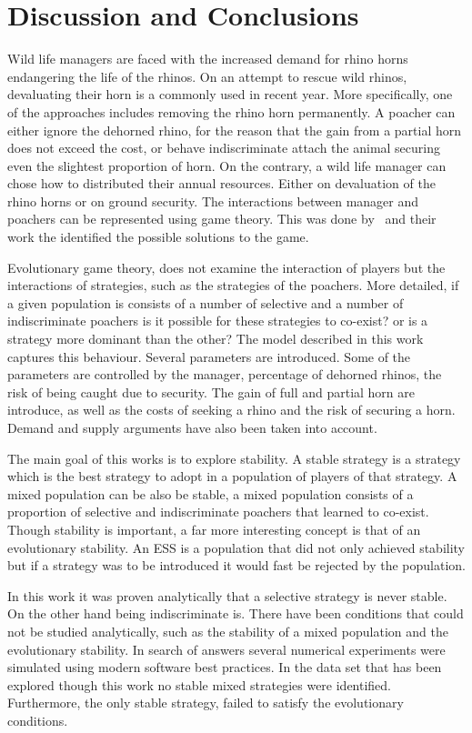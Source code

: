 \documentclass[10pt]{article}
\begin{document}
\section{Discussion and Conclusions}

Wild life managers are faced with the increased demand for rhino horns endangering
the life of the rhinos. On an attempt to rescue wild rhinos, devaluating their horn
is a commonly used in recent year.  More specifically, one of the approaches 
includes removing the rhino horn permanently.  A poacher can either
ignore the dehorned rhino, for the reason that the gain from a partial horn does
not exceed the cost, or behave indiscriminate attach the animal securing even
the slightest proportion of horn.  On the contrary, a wild
life manager can chose how to distributed their annual resources. Either
on devaluation of the rhino horns or on ground security. The interactions
between manager and poachers can be represented using game theory. This
was done by~\cite{Lee} and their work the identified the possible solutions
to the game.

Evolutionary game theory, does not examine the interaction of players but the
interactions of strategies, such as the strategies of the poachers. More detailed,
if a given population is consists of a number of selective and a number of 
indiscriminate poachers is it possible for these strategies to co-exist? or 
is a strategy more dominant than the other? The model described in this
work captures this behaviour.  Several parameters are introduced. Some of
the parameters are controlled by the manager, percentage of dehorned rhinos,
the risk of being caught due to security. The gain of full and partial horn are
introduce, as well as the costs of seeking a rhino and the risk of securing 
a horn.  Demand and supply arguments have also been taken into account.

The main goal of this works is to explore stability. A stable strategy is a strategy
which is the best strategy to adopt in a population of players of that strategy. A mixed
population can be also be stable, a mixed population consists of a proportion
of selective and indiscriminate poachers that learned to co-exist. Though stability
is important, a far more interesting concept is that of an evolutionary stability.
An  ESS is a population that did not only achieved stability but  if a strategy
was to be introduced it would fast be rejected by the population.  

In this work it was proven analytically that a selective strategy is never stable. 
On the other hand being indiscriminate is. There have been conditions
that could not be studied analytically, such as the stability of a mixed 
population and the evolutionary stability. In search of answers several
numerical experiments were simulated using modern software best 
practices. In the data set that has been explored though this work no stable
mixed strategies were identified. Furthermore, the only stable strategy, failed
to satisfy the evolutionary conditions. 
\end{document}
